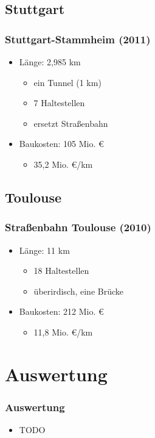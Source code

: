 \documentclass[xcolor=dvipsnames]{beamer}
\begin{document}

\subsection{Stuttgart}
\begin{frame}
  \frametitle{Stuttgart-Stammheim (2011)}

  \begin{itemize}
    \item Länge: 2,985 km
      \begin{itemize}
        \item ein Tunnel (1 km)
        \item 7 Haltestellen
        \item ersetzt Straßenbahn
      \end{itemize}
    \item Baukosten: 105 Mio. €
    \begin{itemize}
        \item 35,2 Mio. €/km
    \end{itemize}
  \end{itemize}
\end{frame}

\subsection{Toulouse}
\begin{frame}
  \frametitle{Straßenbahn Toulouse (2010)}
  \begin{itemize}
    \item Länge: 11 km
      \begin{itemize}
        \item 18 Haltestellen
        \item überirdisch, eine Brücke
      \end{itemize}
    \item Baukosten: 212 Mio. €
    \begin{itemize}
        \item 11,8 Mio. €/km
    \end{itemize}
  \end{itemize}
\end{frame}


\section{Auswertung}
\begin{frame}
    \frametitle{Auswertung}
    \begin{itemize}
      \item TODO
    \end{itemize}
\end{frame}
\end{document}
